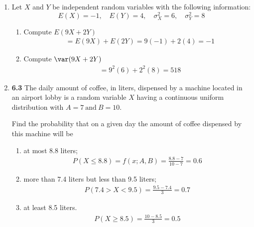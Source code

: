 \documentclass[basic, header]{nosvagor-notes}
\begin{document}
\begin{enumerate}[leftmargin=1.5em, itemsep=2em]
\begin{enumerate}[leftmargin=1.6em]
    \end{enumerate}

  \item Let \(X\) and \(Y\) be independent random variables with the following
    information:
    \[%
     E(X) = -1, \quad E(Y) = 4, \quad \sigma^2_X = 6, \quad \sigma^2_Y = 8
    \]%
    \begin{enumerate}[leftmargin=1.6em]

      \item Compute \(E(9X + 2Y)\)
        \begin{align*}
          &= E(9X) + E(2Y) = 9(-1) + 2(4) = \boxed{-1}
        \end{align*}

      \item Compute \(\var(9X + 2Y)\)
        \begin{align*}
          &= 9^2(6) + 2^2(8) = \boxed{518}
        \end{align*}

    \end{enumerate}

  \newpage %

  \item \textbf{6.3} The daily amount of coffee, in liters, dispensed by a
    machine located in an airport lobby is a random variable \(X\) having a
    continuous uniform distribution with \(A = 7 ~\text{and}~ B = 10\).

    Find the probability that on a given day the amount of coffee dispensed by
    this machine will be
    \begin{enumerate}[leftmargin=1.6em]

      \item at most 8.8 liters;
        \begin{align*}
          P(X \leq 8.8) = f(x; A,B) = \frac{8.8-7}{10-7} = \boxed{0.6}
        \end{align*}

      \item more than 7.4 liters but less than 9.5 liters;
        \begin{align*}
          P(7.4 > X < 9.5) = \frac{9.5-7.4}{3} = \boxed{0.7}
        \end{align*}

      \item at least 8.5 liters.
        \begin{align*}
          P(X \geq 8.5) = \frac{10-8.5}{3} = \boxed{0.5}
        \end{align*}


\end{enumerate}
\end{enumerate}
\end{document}

